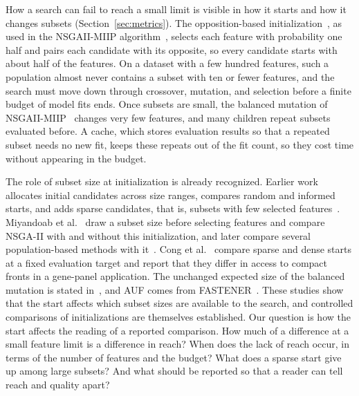 How a search can fail to reach a small limit is visible in how it starts and how it changes subsets (Section~\ref{sec:metrics}). The opposition-based initialization~\cite{Tizhoosh2005OBL}, as used in the NSGAII-MIIP algorithm~\cite{Li2025}, selects each feature with probability one half and pairs each candidate with its opposite, so every candidate starts with about half of the features. On a dataset with a few hundred features, such a population almost never contains a subset with ten or fewer features, and the search must move down through crossover, mutation, and selection before a finite budget of model fits ends. Once subsets are small, the balanced mutation of NSGAII-MIIP~\cite{Oh2004,Li2025} changes very few features, and many children repeat subsets evaluated before. A cache, which stores evaluation results so that a repeated subset needs no new fit, keeps these repeats out of the fit count, so they cost time without appearing in the budget.

The role of subset size at initialization is already recognized. Earlier work allocates initial candidates across size ranges, compares random and informed starts, and adds sparse candidates, that is, subsets with few selected features~\cite{Deniz2019,Kropp2022}. Miyandoab et al.~\cite{Miyandoab2024} draw a subset size before selecting features and compare NSGA-II with and without this initialization, and later compare several population-based methods with it~\cite{Miyandoab2026}. Cong et al.~\cite{Cong2026} compare sparse and dense starts at a fixed evaluation target and report that they differ in access to compact fronts in a gene-panel application. The unchanged expected size of the balanced mutation is stated in~\cite{Oh2004,Li2025}, and AUF comes from FASTENER~\cite{Koprivec2020}. These studies show that the start affects which subset sizes are available to the search, and controlled comparisons of initializations are themselves established. Our question is how the start affects the reading of a reported comparison. How much of a difference at a small feature limit is a difference in reach? When does the lack of reach occur, in terms of the number of features and the budget? What does a sparse start give up among large subsets? And what should be reported so that a reader can tell reach and quality apart?

